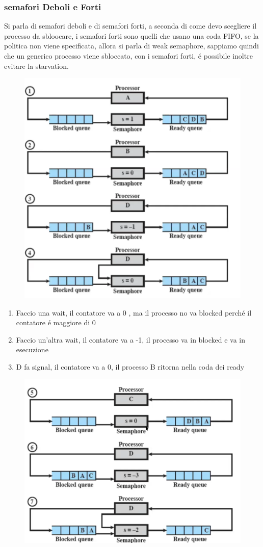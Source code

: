 \subsubsection{semafori Deboli e Forti}
Si parla di semafori deboli e di semafori forti, a seconda di come devo scegliere il processo da sbloocare, i semafori forti sono quelli
che usano una coda FIFO, se la politica non viene specificata, allora si parla di weak semaphore, sappiamo quindi che un generico processo
viene sbloccato, con i semafori forti, é possibile inoltre evitare la starvation.
\begin{figure}[H]
    \centering
    \includegraphics[width=0.7\linewidth]{immagini/SemaforiForti}
\end{figure}
\begin{enumerate}
    \item Faccio una wait, il contatore va a 0 , ma il processo no va blocked perché il contatore é maggiore di 0
    \item Faccio un'altra wait, il contatore va a -1, il processo va in blocked e va in esecuzione
    \item D fa signal, il contatore va a 0, il processo B ritorna nella coda dei ready
\end{enumerate}
\begin{figure}[H]
    \centering
    \includegraphics[width=0.7\linewidth]{immagini/SemaforiForti2}
\end{figure}
